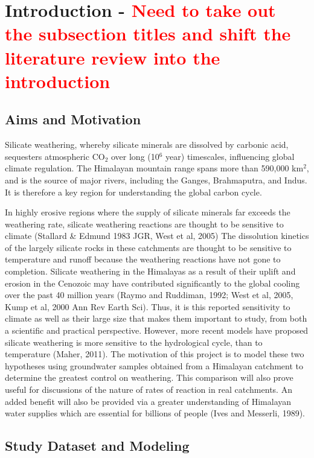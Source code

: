 
\section{Introduction - \textcolor{red}{Need to take out the subsection titles and shift the literature review into the introduction}}

\subsection{Aims and Motivation}

Silicate weathering, whereby silicate minerals are dissolved by carbonic acid, 
sequesters atmospheric CO$_2$ over long (10$^6$ year) timescales, influencing global climate regulation. The Himalayan mountain range spans more than 590,000 km$^2$, and is the source of major rivers, including the Ganges, Brahmaputra, and Indus. It is therefore a key region for understanding the global carbon cycle.

\bsk

In highly erosive regions where the supply of silicate minerals far exceeds the weathering rate, silicate weathering reactions are thought to be sensitive to climate (Stallard \& Edmund 1983 JGR, West et al, 2005) The dissolution kinetics of the largely silicate rocks in these catchments are thought to be sensitive to temperature and runoff because the weathering reactions have not gone to completion. Silicate weathering in the Himalayas as a result of their uplift and erosion in the Cenozoic may have contributed significantly to the global 
cooling over the past 40 million years (Raymo and Ruddiman, 1992; West et al, 2005, Kump et al, 2000 Ann Rev Earth Sci). Thus, it is this reported sensitivity to climate as well as their large size that makes them important to study, from both a scientific and practical perspective. However, more recent models have proposed silicate weathering is more sensitive to the hydrological cycle, than to temperature (Maher, 2011). The motivation of this project is to model these two hypotheses using groundwater samples obtained from a Himalayan catchment to determine the greatest control on weathering. This comparison will also prove useful for discussions of the nature of rates of reaction in real catchments. An added benefit will also be provided via a greater understanding of Himalayan water supplies which are essential for billions of people (Ives and Messerli, 1989). 


\subsection{Study Dataset and Modeling}

